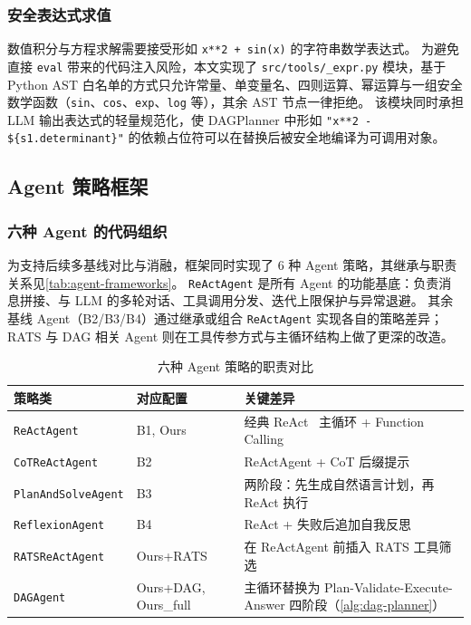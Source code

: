 \subsubsection{安全表达式求值}

数值积分与方程求解需要接受形如 \texttt{x**2 + sin(x)} 的字符串数学表达式。
为避免直接 \texttt{eval} 带来的代码注入风险，本文实现了 \texttt{src/tools/\_expr.py} 模块，基于 Python AST 白名单的方式只允许常量、单变量名、四则运算、幂运算与一组安全数学函数（\texttt{sin}、\texttt{cos}、\texttt{exp}、\texttt{log} 等），其余 AST 节点一律拒绝。
该模块同时承担 LLM 输出表达式的轻量规范化，使 DAGPlanner 中形如 \verb|"x**2 - ${s1.determinant}"| 的依赖占位符可以在替换后被安全地编译为可调用对象。

\subsection{Agent 策略框架}\label{sec:agent-frameworks}

\subsubsection{六种 Agent 的代码组织}

为支持后续多基线对比与消融，框架同时实现了 6 种 Agent 策略，其继承与职责关系见\autoref{tab:agent-frameworks}。
\texttt{ReActAgent} 是所有 Agent 的功能基底：负责消息拼接、与 LLM 的多轮对话、工具调用分发、迭代上限保护与异常退避。
其余基线 Agent（B2/B3/B4）通过继承或组合 \texttt{ReActAgent} 实现各自的策略差异；
RATS 与 DAG 相关 Agent 则在工具传参方式与主循环结构上做了更深的改造。

\begin{table}[htbp]
    \centering
    \caption{\label{tab:agent-frameworks}六种 Agent 策略的职责对比}
    \begin{tabularx}{\linewidth}{llX}
        \toprule
        策略类 & 对应配置 & 关键差异 \\ \midrule
        \texttt{ReActAgent} & B1, Ours & 经典 ReAct~\cite{yao2023react} 主循环 + Function Calling \\
        \texttt{CoTReActAgent} & B2 & ReActAgent + CoT 后缀提示\cite{wei2022cot} \\
        \texttt{PlanAndSolveAgent} & B3 & 两阶段：先生成自然语言计划，再 ReAct 执行\cite{wang2023plansolve} \\
        \texttt{ReflexionAgent} & B4 & ReAct + 失败后追加自我反思\cite{shinn2023reflexion} \\
        \texttt{RATSReActAgent} & Ours+RATS & 在 ReActAgent 前插入 RATS 工具筛选 \\
        \texttt{DAGAgent} & Ours+DAG, Ours\_full & 主循环替换为 Plan-Validate-Execute-Answer 四阶段（\autoref{alg:dag-planner}） \\ \bottomrule
    \end{tabularx}
\end{table}

